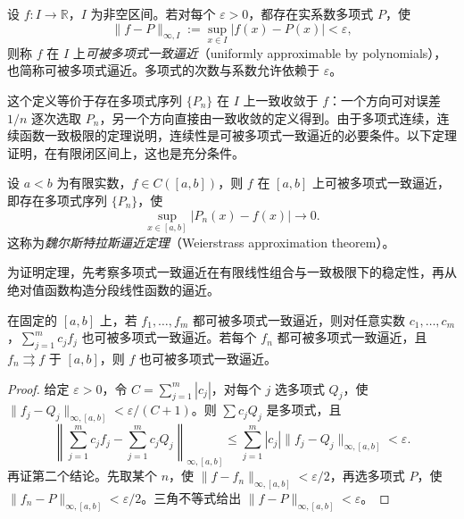 \documentclass[UTF8,12pt,a4paper,fontset=fandol]{ctexbook}
\begin{document}
\begin{definition}
\label{def:uniform-polynomial-approximation}
设 $f:I\to\mathbb R$，$I$ 为非空区间。若对每个 $\varepsilon>0$，都存在实系数多项式 $P$，使
\begin{equation}
    \|f-P\|_{\infty,I}:=\sup_{x\in I}|f(x)-P(x)|<\varepsilon,
    \label{eq:uniform-polynomial-approximation}
\end{equation}
则称 $f$ 在 $I$ 上\emph{可被多项式一致逼近}（uniformly approximable by polynomials），也简称可被多项式逼近。多项式的次数与系数允许依赖于 $\varepsilon$。
\end{definition}

这个定义等价于存在多项式序列 $\{P_n\}$ 在 $I$ 上一致收敛于 $f$：一个方向可对误差 $1/n$ 逐次选取 $P_n$，另一个方向直接由一致收敛的定义得到。由于多项式连续，连续函数一致极限的定理说明，连续性是可被多项式一致逼近的必要条件。以下定理证明，在有限闭区间上，这也是充分条件。

\begin{theorem}[魏尔斯特拉斯逼近定理]
\label{thm:weierstrass-polynomial-approximation}
设 $a<b$ 为有限实数，$f\in C([a,b])$，则 $f$ 在 $[a,b]$ 上可被多项式一致逼近，即存在多项式序列 $\{P_n\}$，使
\[
    \sup_{x\in[a,b]}|P_n(x)-f(x)|\longrightarrow0.
\]
这称为\emph{魏尔斯特拉斯逼近定理}（Weierstrass approximation theorem）。
\end{theorem}

为证明定理，先考察多项式一致逼近在有限线性组合与一致极限下的稳定性，再从绝对值函数构造分段线性函数的逼近。

\begin{lemma}[有限线性组合与一致极限]
\label{lem:polynomial-approximation-closure}
在固定的 $[a,b]$ 上，若 $f_1,\ldots,f_m$ 都可被多项式一致逼近，则对任意实数 $c_1,\ldots,c_m$，$\sum_{j=1}^mc_jf_j$ 也可被多项式一致逼近。若每个 $f_n$ 都可被多项式一致逼近，且 $f_n\rightrightarrows f$ 于 $[a,b]$，则 $f$ 也可被多项式一致逼近。
\end{lemma}

\begin{proof}
给定 $\varepsilon>0$，令 $C=\sum_{j=1}^m|c_j|$，对每个 $j$ 选多项式 $Q_j$，使 $\|f_j-Q_j\|_{\infty,[a,b]}<\varepsilon/(C+1)$。则 $\sum c_jQ_j$ 是多项式，且
\[
    \left\|\sum_{j=1}^mc_jf_j-\sum_{j=1}^mc_jQ_j\right\|_{\infty,[a,b]}
       \leq\sum_{j=1}^m|c_j|\|f_j-Q_j\|_{\infty,[a,b]}
       <\varepsilon.
\]
再证第二个结论。先取某个 $n$，使 $\|f-f_n\|_{\infty,[a,b]}<\varepsilon/2$，再选多项式 $P$，使 $\|f_n-P\|_{\infty,[a,b]}<\varepsilon/2$。三角不等式给出 $\|f-P\|_{\infty,[a,b]}<\varepsilon$。
\end{proof}
\end{document}
